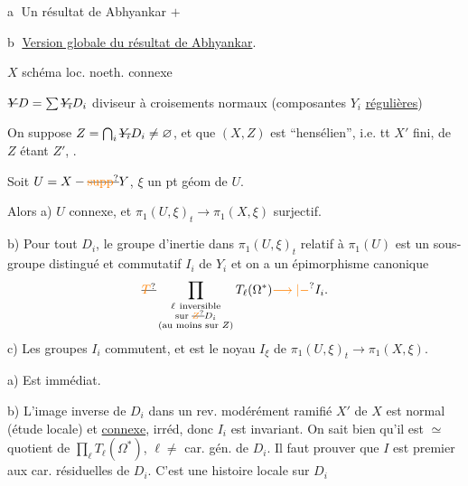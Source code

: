 
\textcircled{a} Un résultat  de Abhyankar \textcircled{$+$}

\textcircled{b} \uline{Version globale du  résultat de Abhyankar}.

$X$ schéma loc. noeth. connexe

$\deleted{Y}D=\sum\deleted{Y_i}D_i$ diviseur  à croisements normaux
(composantes $Y_i$ \uline{régulières})

On suppose $Z=\bigcap_i\deleted{Y_i}D_i\ne\varnothing$, et que   $(X,Z)$ est ``hensélien'', i.e.
 tt $X'$ fini,  de $Z$ étant $Z'$,   \unsure{$\longleftrightarrow$}.

 Soit  $U=X-\deleted{\unsure{\operatorname{supp}}}Y$, $\xi$ un pt géom de $U$.

Alors a) $U$ connexe, et $\pi_1(U,\xi)_t\longrightarrow\pi_1(X,\xi)$ surjectif.

b) Pour tout $D_i$, le groupe d'inertie dans
$\pi_1(U,\xi)_t$ relatif à $\pi_1(U)$ est un sous-groupe distingué et
 commutatif $I_i$ de $Y_i$  et on a
un épimorphisme canonique
\[
 \deleted{\unsure{T}}\prod_{\substack{\ell\ \text{inversible}\\\text{sur }\deleted{\unsure{Z}}D_i\\(\text{au moins sur }Z)}}T_\ell(\Omega^*)\unsure{\longrightarrow|-}I_i .
\]
c) Les groupes $I_i$ commutent, et   est le noyau $I_\xi$ de $\pi_1(U,\xi)_t\longrightarrow\pi_1(X,\xi)$.

a) Est immédiat.

b) L'image inverse de $D_i$ dans un rev.   modérément
ramifié $X'$ de $X$ est normal (étude locale) et \uline{connexe},
 irréd, donc $I_i$ est invariant. On sait
bien qu'il est $\simeq$ quotient de $\prod_\ell T_\ell(\Omega^*)$, $\ell\ne$ car. gén. de $D_i$.
Il faut prouver que $I$ est premier aux car. résiduelles
de $D_i$. C'est une histoire locale sur $D_i$

